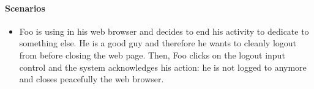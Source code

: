 \paragraph{Scenarios}
\begin{itemize}
	\item Foo is using \myTaxiService{} in his web browser and decides to end his activity to dedicate to something else.
	He is a good guy and therefore he wants to cleanly logout from \myTaxiService{} before closing the web page.
	Then, Foo clicks on the logout input control and the system acknowledges his action: he is not logged to \myTaxiService{} anymore and closes peacefully the web browser.
\end{itemize}
